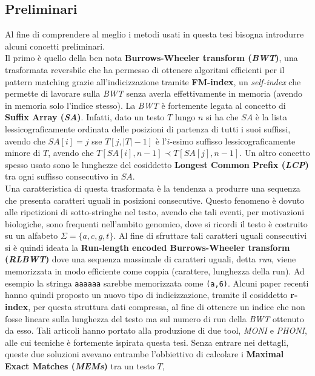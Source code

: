 \documentclass[a4paper,11pt, oneside]{article}
\begin{document}
\subsection*{Preliminari}
Al fine di comprendere al meglio i metodi usati in questa tesi bisogna
introdurre alcuni concetti preliminari.\\
Il primo è quello della ben nota \textbf{Burrows-Wheeler transform
  (\textit{BWT})}, una trasformata reversbile che ha permesso di ottenere
algoritmi efficienti per il pattern matching grazie all'indicizzazione tramite
\textbf{FM-index}, un \textit{self-index} che permette di lavorare sulla
\textit{BWT} senza averla effettivamente in memoria (avendo in memoria solo
l'indice stesso). La \textit{BWT} è fortemente legata al concetto di
\textbf{Suffix Array (\textit{SA})}. Infatti, dato un testo $T$ lungo $n$ si ha
che $SA$ è la lista lessicograficamente ordinata delle posizioni di partenza di
tutti i suoi suffissi, avendo che $SA[i]=j$ sse $T[j, |T|-1]$ è l'$i$-esimo
suffisso lessicograficamente minore di $T$, avendo che $T[SA[i],n-1] \prec
T[SA[j],n-1]$. Un altro concetto spesso usato
sono le lunghezze del cosiddetto \textbf{Longest Common Prefix (\textit{LCP})}
tra ogni suffisso consecutivo in $SA$.\\
Una caratteristica di questa trasformata è la tendenza a
produrre una sequenza che presenta caratteri uguali in posizioni
consecutive. Questo fenomeno è dovuto alle ripetizioni di sotto-stringhe nel
testo, avendo che tali eventi, per motivazioni biologiche, sono frequenti
nell'ambito genomico, dove si ricordi il testo è costruito su un alfabeto
$\Sigma=\{a,c,g,t\}$. Al fine di sfruttare tali caratteri uguali consecutivi si
è quindi ideata la \textbf{Run-length encoded Burrows-Wheeler transform
  (\textit{RLBWT})} dove una sequenza massimale di caratteri uguali, detta
\textit{run}, viene memorizzata in modo efficiente come coppia (carattere,
lunghezza della run). Ad esempio la stringa \texttt{aaaaaa} sarebbe memorizzata
come \texttt{(a,6)}. Alcuni paper recenti hanno quindi proposto un nuovo tipo di
indicizzazione, tramite il cosiddetto \textbf{r-index}, per questa struttura
dati compressa, al fine di ottenere un indice che non fosse lineare sulla
lunghezza del testo ma sul numero di run della \textit{BWT} ottenuto da
esso. Tali articoli hanno portato alla produzione di due tool, \textit{MONI} e
\textit{PHONI}, alle cui tecniche è fortemente ispirata questa tesi. Senza
entrare nei dettagli, queste due soluzioni avevano entrambe l'obbiettivo di
calcolare i \textbf{Maximal Exact Matches (\textit{MEMs})} tra un testo $T$,
\end{document}
